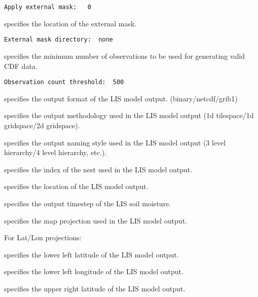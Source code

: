  \begin{Verbatim}[frame=single]
Apply external mask:   0 
 \end{Verbatim}

 
 specifies the location of the external mask.
 

 \begin{Verbatim}[frame=single]
External mask directory:  none
 \end{Verbatim}


 
 specifies the minimum number of observations to be used for generating
 valid CDF data.
 

 \begin{Verbatim}[frame=single]
Observation count threshold:  500
 \end{Verbatim}


 
 specifies the output format of the LIS model output.
 (binary/netcdf/grib1)

 specifies the output methodology used in the LIS model output
 (1d tilespace/1d gridspace/2d gridspace).

 specifies the output naming style used in the LIS model output 
 (3 level hierarchy/4 level hierarchy, etc.).

 specifies the index of the nest used in the LIS model output.

 specifies the location of the LIS model output.

  specifies the output
 timestep of the LIS soil moisture.

 specifies the map projection used in the LIS model output.

 For Lat/Lon projections:

 specifies the lower left latitude of the LIS model output.

 specifies the lower left longitude of the LIS model output.

 specifies the upper right latitude of the LIS model output.

